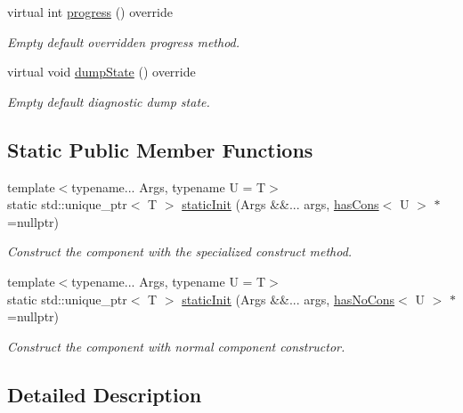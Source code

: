 \begin{DoxyCompactItemize}
virtual int \hyperlink{structvt_1_1runtime_1_1component_1_1_component_a1dab11d9eb5bed8dfd5a3bb8fdf67f5a}{progress} () override
\begin{DoxyCompactList}\small\item\em Empty default overridden progress method. \end{DoxyCompactList}\item 
virtual void \hyperlink{structvt_1_1runtime_1_1component_1_1_component_adaf8bd995d4c91702e2ff7806ad9e695}{dump\+State} () override
\begin{DoxyCompactList}\small\item\em Empty default diagnostic dump state. \end{DoxyCompactList}\end{DoxyCompactItemize}
\subsection*{Static Public Member Functions}
\begin{DoxyCompactItemize}
\item 
{\footnotesize template$<$typename... Args, typename U  = T$>$ }\\static std\+::unique\+\_\+ptr$<$ T $>$ \hyperlink{structvt_1_1runtime_1_1component_1_1_component_a7d82b061566ef21d6438f4701ae6b733}{static\+Init} (Args \&\&... args, \hyperlink{structvt_1_1runtime_1_1component_1_1_component_aca5f3a7c1db697b6d0ba70de7ff8b887}{has\+Cons}$<$ U $>$ $\ast$=nullptr)
\begin{DoxyCompactList}\small\item\em Construct the component with the specialized construct method. \end{DoxyCompactList}\item 
{\footnotesize template$<$typename... Args, typename U  = T$>$ }\\static std\+::unique\+\_\+ptr$<$ T $>$ \hyperlink{structvt_1_1runtime_1_1component_1_1_component_aaada4d04e8adf4cc5556bed2fdcdb321}{static\+Init} (Args \&\&... args, \hyperlink{structvt_1_1runtime_1_1component_1_1_component_a389e53dbfc20013d66ef09d4f42c0a53}{has\+No\+Cons}$<$ U $>$ $\ast$=nullptr)
\begin{DoxyCompactList}\small\item\em Construct the component with normal component constructor. \end{DoxyCompactList}\end{DoxyCompactItemize}


\subsection{Detailed Description}
